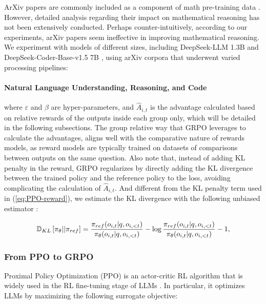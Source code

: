 \begin{itemize}[topsep=0pt]
ArXiv papers are commonly included as a component of math pre-training data \citep{minerva,gpt-f,llemma,mathpile}. However, detailed analysis regarding their impact on mathematical reasoning has not been extensively conducted. Perhaps counter-intuitively, according to our experiments, arXiv papers seem ineffective in improving mathematical reasoning. We experiment with models of different sizes, including DeepSeek-LLM 1.3B and DeepSeek-Coder-Base-v1.5 7B \citep{deepseek-coder}, using arXiv corpora that underwent varied processing pipelines:

\paragraph{Natural Language Understanding, Reasoning, and Code}



where $\varepsilon$ and $\beta$ are hyper-parameters, and $\hat{A}_{i,t}$  is the advantage calculated based on relative rewards of the outputs inside each group only, which will be detailed in the following subsections. The group relative way that GRPO leverages to calculate the advantages, aligns well with the comparative nature of rewards models,  as reward models are typically trained on datasets of comparisons between outputs on the same question. Also note that, instead of adding KL penalty in the reward, GRPO regularizes by directly adding the KL divergence between the trained policy and the reference policy to the loss, avoiding complicating the calculation of  $\hat{A}_{i,t}$. And different from the KL penalty term used in (\ref{eq:PPO-reward}), we estimate the KL divergence with the following unbiased estimator \citep{kl_approx}:

\begin{equation}
\small
    \mathbb{D}_{KL}\left[\pi_{\theta} || \pi_{ref}\right] = \frac{\pi_{ref}(o_{i,t}|q,o_{i,<t})}{\pi_{\theta}(o_{i,t}|q,o_{i,<t})}- \log\frac{\pi_{ref}(o_{i,t}|q,o_{i,<t})}{\pi_{\theta}(o_{i,t}|q,o_{i,<t})} - 1,
\end{equation}

\subsubsection{From PPO to GRPO} Proximal Policy Optimization (PPO) \citep{schulman2017proximal} is an actor-critic RL algorithm that is widely used in the RL fine-tuning stage of LLMs \citep{ouyang2022training}. In particular, it optimizes LLMs by maximizing the following surrogate objective:


\end{itemize}
